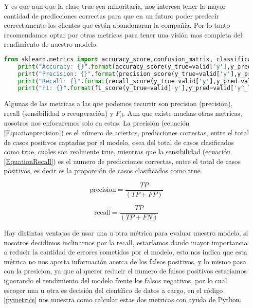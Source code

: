 Y es que aun que la clase true sea minoritaria, nos interesa tener la mayor cantidad de predicciones correctas para que en un futuro poder predecir correctamente los clientes que están abandonaran la compañía. Por lo tanto recomendamos optar por otras metricas para tener una visión mas completa del rendimiento de nuestro modelo. 

\begin{lstlisting}[language=Python, caption=código para calculo de metricas, label=pymetrics]
	from sklearn.metrics import accuracy_score,confusion_matrix, classification_report, precision_score, recall_score, f1_score
	print("Accuracy: {}".format(accuracy_score(y_true=valid['y'],y_pred=valid['y^_lr'])))
	print("Precision: {}".format(precision_score(y_true=valid['y'],y_pred=valid['y^_lr'])))
	print("Recall: {}".format(recall_score(y_true=valid['y'],y_pred=valid['y^_lr'])))
	print("F1: {}".format(f1_score(y_true=valid['y'],y_pred=valid['y^_lr'])))
\end{lstlisting}

Algunas de las metricas a las que podemos recurrir son precision (precisión), recall (sensibilidad o recuperación) y $F_\beta$. Aun que existe muchas otras metricas, nosotros nos enfocaremos solo en estas. La precisión (ecuación \ref{Equationprecision}) es el número de aciertos, predicciones correctas, entre el total de casos positivos captados por el modelo, osea del total de casos clasificados como true, cuales son realmente true, mientras que la sensibilidad (ecuación \ref{EquationRecall}) es el numero de predicciones correctas, entre el total de casos positivos, es decir es la proporción de casos clasificados como true.

\begin{equation}
	\textrm{precision}=\frac{TP}{(TP+FP)} 
	\label{Equationprecision}
\end{equation}

\begin{equation}
	\textrm{recall}=\frac{TP}{(TP+FN)} 
	\label{EquationRecall}
\end{equation}

Hay distintas ventajas de usar una u otra métrica para evaluar nuestro modelo, si nosotros decidimos inclinarnos por la recall, estaríamos dando mayor importancia a reducir la cantidad de errores cometidos por el modelo, esto nos indica que esta métrica no nos aporta información acerca de los falsos positivos, y lo mismo pasa con la presicion, ya que al querer reducir el numero de falsos positivos estaríamos ignorando el rendimiento del modelo frente los falsos negativos, por lo cual escoger una u otra es decisión del científico de datos a cargo, en el código \ref{pymetrics} nos muestra como calcular estas dos metricas con ayuda de Python.

